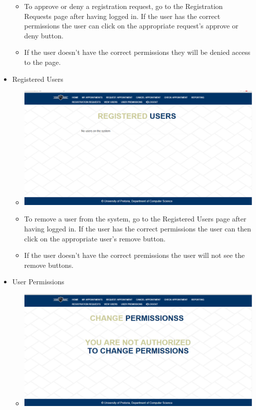 \begin{itemize}
\begin{itemize}
				\item To approve or deny a registration request, go to the Registration Requests page after having logged in. If the user has the correct permissions the user can click on the appropriate request's approve or deny button.
				\item If the user doesn't have the correct permissions they will be denied access to the page.
			\end{itemize}
		\item Registered Users
			\begin{itemize}
				\item \includegraphics[width=\linewidth]{images/Screenshots/Registered_Users.png}
				\item To remove a user from the system, go to the Registered Users page after having logged in. If the user has the correct permissions the user can then click on the appropriate user's remove button.
				\item If the user doesn't have the correct premissions the user will not see the remove buttons.
			\end{itemize}
		\item User Permissions
			\begin{itemize}
				\item \includegraphics[width=\linewidth]{images/Screenshots/ChangePermissions.png}

\end{itemize}
\end{itemize}

